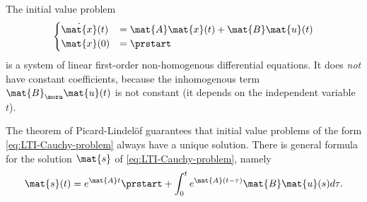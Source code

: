 

\begin{remark}
    The initial value problem
    \begin{align}\label{eq:LTI-Cauchy-problem}
        \begin{cases}
            \dot{\mat{x}}(t) & = \mat{A} \mat{x}(t) + \mat{B} \mat{u}(t) \\
            \mat{x}(0)       & = \prstart
        \end{cases}
    \end{align}
    is a system of linear first-order non-homogenous differential equations.
    It does \emph{not} have constant coefficients, because the inhomogenous term $\mat{B}_\mora\mat{u}(t)$ is not constant (it depends on the independent variable $t$).

    The theorem of Picard-Lindelöf guarantees that initial value problems of the form \cref{eq:LTI-Cauchy-problem} always have a unique solution.
    There is general formula for the solution $\mat{s}$ of \cref{eq:LTI-Cauchy-problem}, namely
    \begin{equation}
        \mat{s}(t) = e^{\mat{A} t} \prstart + \int_{0}^{t} e^{\mat{A} (t - \tau)}\mat{B}\mat{u}(s)d\tau.
    \end{equation}

\end{remark}

